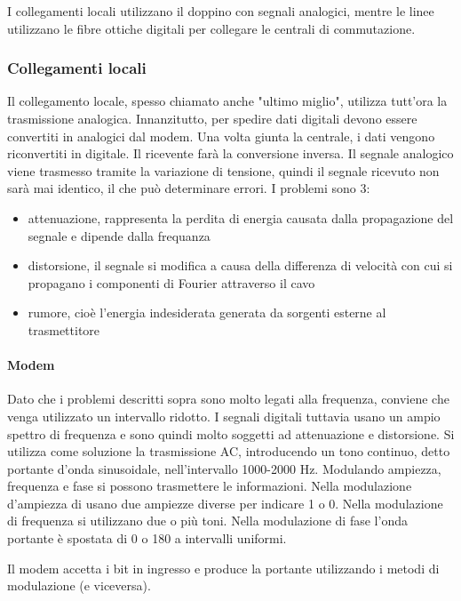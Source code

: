 I collegamenti locali utilizzano il doppino con segnali analogici, mentre le linee utilizzano le fibre ottiche digitali per collegare le centrali di commutazione.

\subsubsection{Collegamenti locali}
Il collegamento locale, spesso chiamato anche "ultimo miglio", utilizza tutt'ora la trasmissione analogica.
Innanzitutto, per spedire dati digitali devono essere convertiti in analogici dal modem. 
Una volta giunta la centrale, i dati vengono riconvertiti in digitale.
Il ricevente farà la conversione inversa.
Il segnale analogico viene trasmesso tramite la variazione di tensione, quindi il segnale ricevuto non sarà mai identico, il che può determinare errori.
I problemi sono 3:
\begin{itemize}
    \item attenuazione, rappresenta la perdita di energia causata dalla propagazione del segnale e dipende dalla frequanza
    \item distorsione, il segnale si modifica a causa della differenza di velocità con cui si propagano i componenti di Fourier attraverso il cavo
    \item rumore, cioè l'energia indesiderata generata da sorgenti esterne al trasmettitore
\end{itemize}

\paragraph{Modem}
Dato che i problemi descritti sopra sono molto legati alla frequenza, conviene che venga utilizzato un intervallo ridotto.
I segnali digitali tuttavia usano un ampio spettro di frequenza e sono quindi molto soggetti ad attenuazione e distorsione.
Si utilizza come soluzione la trasmissione AC, introducendo un tono continuo, detto portante d'onda sinusoidale, nell'intervallo 1000-2000 Hz.
Modulando ampiezza, frequenza e fase si possono trasmettere le informazioni.
Nella modulazione d'ampiezza di usano due ampiezze diverse per indicare 1 o 0.
Nella modulazione di frequenza si utilizzano due o più toni.
Nella modulazione di fase l'onda portante è spostata di 0 o 180 a intervalli uniformi.

Il modem accetta i bit in ingresso e produce la portante utilizzando i metodi di modulazione (e viceversa).


